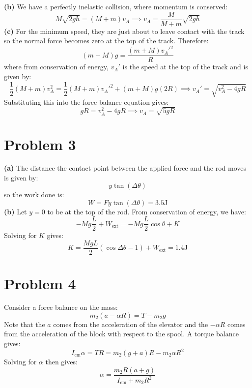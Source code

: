 \documentclass{article}
\let\oldtextbf\textbf
\renewcommand{\textbf}[1]{\oldtextbf{#1}\index{#1}}
\begin{document}
\textbf{(b)} We have a perfectly inelastic collision, where momentum is conserved:
\begin{equation}
    M\sqrt{2gh} = (M+m)v_A \implies v_A = \frac{M}{M+m}\sqrt{2gh}
    \label{eq:}
\end{equation}
\textbf{(c)} For the minimum speed, they are just about to leave contact with the track so the normal force becomes zero at the top of the track. Therefore:
\begin{equation}
    (m+M)g = \frac{(m+M)v_A'^2}{R}
    \label{eq:}
\end{equation}
where from conservation of energy, $v_A'$ is the speed at the top of the track and is given by:
\begin{equation}
    \frac{1}{2}(M+m)v_A^2 = \frac{1}{2}(M+m)v_A'^2 + (m+M)g(2R) \implies v_A' = \sqrt{v_A^2-4gR}
    \label{eq:}
\end{equation}
Substituting this into the force balance equation gives:
\begin{equation}
    gR = v_A^2-4gR \implies v_A = \sqrt{5gR}
    \label{eq:}
\end{equation}

\section*{Problem 3}
\textbf{(a)} The distance the contact point between the applied force and the rod moves is given by:
\begin{equation}
    y\tan(\Delta\theta)
    \label{eq:}
\end{equation}
so the work done is:
\begin{equation}
    W = Fy\tan(\Delta\theta) = 3.5\si{\joule}
    \label{eq:}
\end{equation}
\textbf{(b)} Let $y=0$ to be at the top of the rod. From conservation of energy, we have:
\begin{equation}
    -Mg\frac{L}{2} + W_\text{ext} = -Mg\frac{L}{2}\cos\theta  + K
    \label{eq:}
\end{equation}
Solving for $K$ gives:
\begin{equation}
    K = \frac{MgL}{2}\left(\cos\Delta\theta-1\right) + W_\text{ext} = 1.4\si{\joule}
    \label{eq:}
\end{equation}

\section*{Problem 4}
Consider a force balance on the mass:
\begin{equation}
    m_2(a-\alpha R) = T - m_2g
    \label{eq:}
\end{equation}
Note that the $a$ comes from the acceleration of the elevator and the $-\alpha R$ comes from the acceleration of the block with respect to the spool. A torque balance gives:
\begin{equation}
    I_\text{cm}\alpha = TR = m_2(g+a)R-m_2\alpha R^2
    \label{eq:}
\end{equation}
Solving for $\alpha$ then gives:
\begin{equation}
    \alpha = \frac{m_2R(a+g)}{I_\text{cm}+m_2R^2}
    \label{eq:}
\end{equation}
\end{document}
